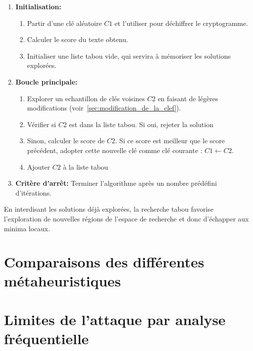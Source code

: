 \documentclass[a4paper]{article}
\begin{document}
\begin{enumerate}
    \item \textbf{Initialisation:}
    \begin{enumerate}
        \item Partir d'une clé aléatoire $C1$ et l'utiliser pour déchiffrer le cryptogramme.
        \item Calculer le score du texte obtenu.
        \item Initialiser une liste tabou vide, qui servira à mémoriser les solutions explorées.
    \end{enumerate}
    \item \textbf{Boucle principale:}
    \begin{enumerate}[label= (\alph*)]
        \item Explorer un echantillon de clés voisines $C2$ en faisant de légères modifications (voir~\ref{sec:modification_de_la_clef}).
        \item Vérifier si $C2$ est dans la liste tabou. Si oui, rejeter la solution
        \item Sinon, calculer le score de $C2$. Si ce score est meilleur que le score précédent, adopter cette nouvelle clé comme clé courante : $C1 \leftarrow C2$.
        \item Ajouter $C2$ à la liste tabou 
    \end{enumerate}
    \item \textbf{Critère d'arrêt:} Terminer l'algorithme après un nombre prédéfini d'itérations.
\end{enumerate}


En interdisant les solutions déjà explorées, la recherche tabou favorise l'exploration de nouvelles régions de l'espace de recherche et donc d'échapper aux minima locaux.

\section{Comparaisons des différentes métaheuristiques}
\label{sec:comparaison_meta}


\section{Limites de l'attaque par analyse fréquentielle}
\end{document}
